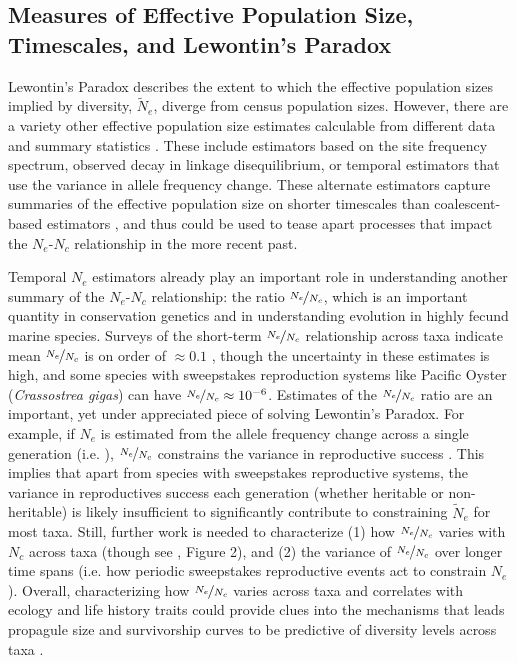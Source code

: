 \documentclass[9pt,lineno]{elife}
\begin{document}
\subsection{Measures of Effective Population Size, Timescales, and Lewontin's Paradox}

Lewontin's Paradox describes the extent to which the effective population sizes
implied by diversity, $\widetilde{N}_e$, diverge from census population sizes.
However, there are a variety other effective population size estimates
calculable from different data and summary statistics
\citep{Wang2016-mi,Caballero1994-ao,Caballero2020-wm,Galtier2020-fb}. These
include estimators based on the site frequency spectrum, observed decay in
linkage disequilibrium, or temporal estimators that use the variance in allele
frequency change. These alternate estimators capture summaries of the effective
population size on shorter timescales than coalescent-based estimators
\citep{Wang2005-wy}, and thus could be used to tease apart processes that
impact the $N_e$-$N_c$ relationship in the more recent past. 

Temporal $N_e$ estimators already play an important role in understanding
another summary of the $N_e$-$N_c$ relationship: the ratio
$\nicefrac{N_e}{N_c}$, which is an important quantity in conservation genetics
\citep{Frankham1995-xz,Mace1991-ai} and in understanding evolution in
highly fecund marine species. Surveys of the short-term $\nicefrac{N_e}{N_c}$
relationship across taxa indicate mean $\nicefrac{N_e}{N_c}$ is on order of
$\approx 0.1$ \citep{Frankham1995-xz,Palstra2008-rt,Palstra2012-vy}, though
the uncertainty in these estimates is high, and some species with sweepstakes
reproduction systems like Pacific Oyster (\emph{Crassostrea gigas}) can have
$\nicefrac{N_e}{N_c} \approx 10^{-6}$. Estimates of the $\nicefrac{N_e}{N_c}$
ratio are an important, yet under appreciated piece of solving Lewontin's
Paradox. For example, if $N_e$ is estimated from the allele frequency change
across a single generation (i.e. \cite{Waples1989-sj}), $\nicefrac{N_e}{N_c}$
constrains the variance in reproductive success
\citep{Wright1938-tv,Nunney1993-ef,Nunney1996-wy}. This implies that apart
from species with sweepstakes reproductive systems, the variance in
reproductives success each generation (whether heritable or non-heritable) is
likely insufficient to significantly contribute to constraining
$\widetilde{N}_e$ for most taxa. Still, further work is needed to characterize
(1) how $\nicefrac{N_e}{N_c}$ varies with $N_c$ across taxa (though see
\cite{Palstra2012-vy}, Figure 2), and (2) the variance of $\nicefrac{N_e}{N_c}$
over longer time spans (i.e. how periodic sweepstakes reproductive events act
to constrain $N_e$). Overall, characterizing how $\nicefrac{N_e}{N_c}$ varies
across taxa and correlates with ecology and life history traits could provide
clues into the mechanisms that leads propagule size and survivorship curves to
be predictive of diversity levels across taxa
\citep{Romiguier2014-bp,Hallatschek2018-iu,Barry2020-pp}.
\end{document}
